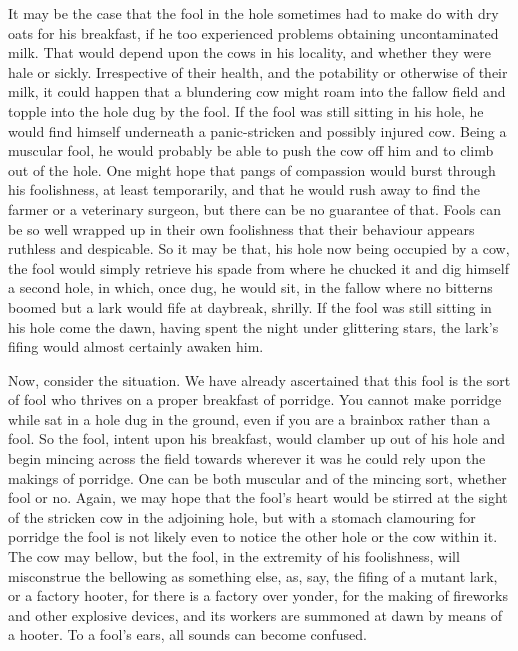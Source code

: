 It may be the case that the fool in the hole sometimes had to make do with dry oats for his breakfast, if he too experienced problems obtaining uncontaminated milk. That would depend upon the cows in his locality, and whether they were hale or sickly. Irrespective of their health, and the potability or otherwise of their milk, it could happen that a blundering cow might roam into the fallow field and topple into the hole dug by the fool. If the fool was still sitting in his hole, he would find himself underneath a panic-stricken and possibly injured cow. Being a muscular fool, he would probably be able to push the cow off him and to climb out of the hole. One might hope that pangs of compassion would burst through his foolishness, at least temporarily, and that he would rush away to find the farmer or a veterinary surgeon, but there can be no guarantee of that. Fools can be so well wrapped up in their own foolishness that their behaviour appears ruthless and despicable. So it may be that, his hole now being occupied by a cow, the fool would simply retrieve his spade from where he chucked it and dig himself a second hole, in which, once dug, he would sit, in the fallow where no bitterns boomed but a lark would fife at daybreak, shrilly. If the fool was still sitting in his hole come the dawn, having spent the night under glittering stars, the lark's fifing would almost certainly awaken him.

Now, consider the situation. We have already ascertained that this fool is the sort of fool who thrives on a proper breakfast of porridge. You cannot make porridge while sat in a hole dug in the ground, even if you are a brainbox rather than a fool. So the fool, intent upon his breakfast, would clamber up out of his hole and begin mincing across the field towards wherever it was he could rely upon the makings of porridge. One can be both muscular and of the mincing sort, whether fool or no. Again, we may hope that the fool's heart would be stirred at the sight of the stricken cow in the adjoining hole, but with a stomach clamouring for porridge the fool is not likely even to notice the other hole or the cow within it. The cow may bellow, but the fool, in the extremity of his foolishness, will misconstrue the bellowing as something else, as, say, the fifing of a mutant lark, or a factory hooter, for there is a factory over yonder, for the making of fireworks and other explosive devices, and its workers are summoned at dawn by means of a hooter. To a fool's ears, all sounds can become confused.


